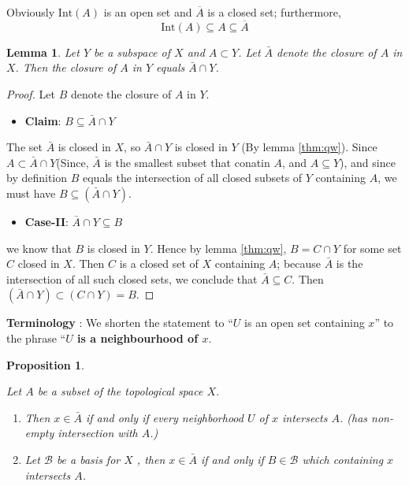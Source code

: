 \documentclass[
]{book}
\providecommand{\tightlist}{%
  \setlength{\itemsep}{0pt}\setlength{\parskip}{0pt}}
\newtheorem{lemma}{Lemma}[chapter]
\newtheorem{proposition}{Proposition}[chapter]
\theoremstyle{definition}
\theoremstyle{definition}
\theoremstyle{definition}
\theoremstyle{definition}
\theoremstyle{remark}
\begin{document}
Obviously \(\text{Int}(A)\) is an open set and \(\overline{A}\) is a closed set; furthermore,
\[\text{Int}(A) \subseteq A \subseteq \overline{A}\]

\begin{lemma}
\protect\hypertarget{lem:unnamed-chunk-66}{}\label{lem:unnamed-chunk-66}Let \(Y\) be a subspace of \(X\) and \(A\subset Y\). Let \(\bar{A}\) denote the closure of \(A\) in \(X\). Then the closure of \(A\) in \(Y\) equals \(\bar{A} \cap Y\).
\end{lemma}

\begin{proof}
Let \(B\) denote the closure of \(A\) in \(Y\).

\begin{itemize}
\tightlist
\item
  \textbf{Claim}: \(B \subseteq \bar{A}\cap Y\)
\end{itemize}

The set \(\bar{A}\) is closed in \(X\), so \(\bar{A} \cap Y\) is closed in \(Y\) (By lemma \ref{thm:qw}). Since \(A\subset \bar{A}\cap Y\)(Since, \(\bar{A}\) is the smallest subset that conatin \(A\), and \(A\subseteq Y\)), and since by definition \(B\) equals the intersection of all closed subsets of \(Y\) containing \(A\), we must have \(B \subseteq (\bar{A} \cap Y)\).

\begin{itemize}
\tightlist
\item
  \textbf{Case-II}: \(\bar{A}\cap Y \subseteq B\)
\end{itemize}

we know that \(B\) is closed in \(Y\). Hence by lemma \ref{thm:qw}, \(B = C \cap Y\) for some set \(C\) closed in \(X\). Then \(C\) is a closed set of \(X\) containing \(A\); because \(\bar{A}\) is the intersection of all such closed sets, we conclude that \(\bar{A} \subseteq C\). Then
\((\bar{A}\cap Y ) \subset (C \cap Y ) = B\).
\end{proof}

\textbf{Terminology} : We shorten the statement to ``\(U\) is an open set containing \(x\)'' to the phrase ``\textbf{\(U\) is a neighbourhood of \(x\)}.

\begin{proposition}
\protect\hypertarget{prp:prop1}{}\label{prp:prop1}

Let \(A\) be a subset of the topological space \(X\).

\begin{enumerate}
\def\labelenumi{\alph{enumi})}
\item
  Then \(x \in \bar{A}\) if and only if every neighborhood \(U\) of \(x\) intersects \(A\). (has non-empty intersection with \(A\).)
\item
  Let \(\mathcal{B}\) be a basis for \(X\) , then \(x \in \bar{A}\) if and only if \(B\in \mathcal{B}\) which containing \(x\) intersects \(A\).
\end{enumerate}

\end{proposition}
\end{document}
